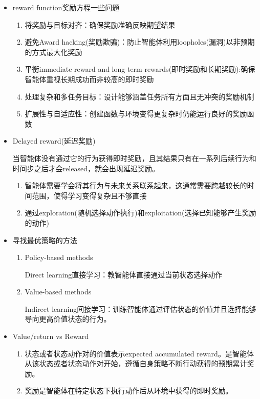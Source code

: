 \documentclass[UTF8]{ctexart}
\begin{document}
\begin{itemize}
    \item reward function奖励方程一些问题
    \begin{enumerate}
        \item 将奖励与目标对齐：确保奖励准确反映期望结果
        \item 避免Award hacking(奖励欺骗)：防止智能体利用loopholes(漏洞)以非预期的方式最大化奖励
        \item 平衡immediate reward and long-term rewards(即时奖励和长期奖励):确保智能体重视长期成功而非较高的即时奖励
        \item 处理复杂和多任务目标：设计能够涵盖任务所有方面且无冲突的奖励机制
        \item 扩展性与自适应性：创建函数与环境变得更复杂时仍能运行良好的奖励函数
    \end{enumerate}

    \item Delayed reward(延迟奖励)
    
    当智能体没有通过它的行为获得即时奖励，且其结果只有在一系列后续行为和时间步之后才会released，就会出现延迟奖励。

    \begin{enumerate}
        \item 智能体需要学会将其行为与未来关系联系起来，这通常需要跨越较长的时间范围，使得学习变得复杂且不够直接
        \item 通过exploration(随机选择动作执行)和exploitation(选择已知能够产生奖励的动作)
    \end{enumerate}

    \item 寻找最优策略的方法
    
    \begin{enumerate}
        \item Policy-based methods
        
        Direct learning直接学习：教智能体直接通过当前状态选择动作
        \item Value-based methods
        
        Indirect learning间接学习：训练智能体通过评估状态的价值并且选择能够导向更高价值状态的行为。
    \end{enumerate}

    \item Value/return vs Reward
    
    \begin{enumerate}
        \item 状态或者状态动作对的价值表示expected accumulated reward。是智能体从该状态或者状态动作对开始，遵循自身策略不断行动获得的预期累计奖励。
        \item 奖励是智能体在特定状态下执行动作后从环境中获得的即时奖励。
    \end{enumerate}


\end{itemize}
\end{document}
